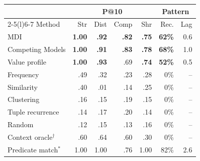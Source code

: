 \begin{tabular}{@{}lrrrrrr@{}}
\toprule
 & \multicolumn{4}{c}{P@10} & \multicolumn{2}{c}{Pattern} \\
\cmidrule(lr){2-5}\cmidrule(l){6-7}
Method & Str & Dist & Comp & Shr & Rec. & Lag \\
\midrule
MDI & \textbf{1.00} & \textbf{.92} & \textbf{.82} & \textbf{.75} & \textbf{62\%} & 0.6 \\
Competing Models & \textbf{1.00} & \textbf{.91} & \textbf{.83} & \textbf{.78} & \textbf{68\%} & 1.0 \\
Value profile & \textbf{1.00} & \textbf{.93} & .69 & \textbf{.74} & \textbf{52\%} & 0.5 \\
Frequency & .49 & .32 & .23 & .28 & 0\% & -- \\
Similarity & .40 & .01 & .14 & .25 & 0\% & -- \\
Clustering & .16 & .15 & .19 & .15 & 0\% & -- \\
Tuple recurrence & .14 & .17 & .20 & .14 & 0\% & -- \\
Random & .12 & .15 & .13 & .16 & 0\% & -- \\
\midrule
Context oracle$^{\dagger}$ & .60 & .64 & .60 & .30 & 0\% & -- \\
Predicate match$^{*}$ & 1.00 & 1.00 & .76 & 1.00 & 82\% & 2.6 \\
\bottomrule
\end{tabular}
